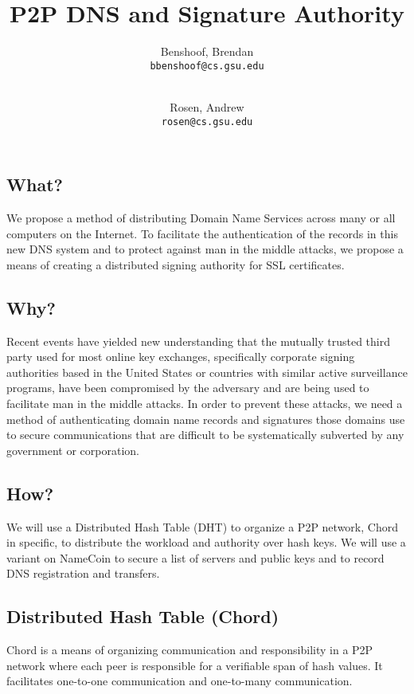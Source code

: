 \documentclass{IEEEtran}
\author{
  Benshoof, Brendan\\
  \texttt{bbenshoof@cs.gsu.edu}
  \and\\
  Rosen, Andrew\\
  \texttt{rosen@cs.gsu.edu}
}
\title{P2P DNS and Signature Authority}
\begin{document}
\maketitle
\subsection{What?}

We propose a method of distributing Domain Name Services across many or
all computers on the Internet. To facilitate the authentication of the
records in this new DNS system and to protect against man in the middle
attacks, we propose a means of creating a distributed signing authority
for SSL certificates.

\subsection{Why?}

Recent events have yielded new understanding that the mutually trusted
third party used for most online key exchanges, specifically corporate
signing authorities based in the United States or countries with similar
active surveillance programs, have been compromised by the adversary and
are being used to facilitate man in the middle attacks. In order to
prevent these attacks, we need a method of authenticating domain name
records and signatures those domains use to secure communications that
are difficult to be systematically subverted by any government or
corporation.

\subsection{How?}

We will use a Distributed Hash Table (DHT) to organize a P2P network, Chord in specific, to distribute the workload and authority over hash keys. We will use a variant on NameCoin to secure a list of servers and public keys  and to record DNS registration and transfers.

\subsection{Distributed Hash Table (Chord)}

Chord is a means of organizing communication and responsibility in a P2P network where each peer is responsible for a verifiable span of hash values. It facilitates one-to-one communication and one-to-many communication.
\end{document}
